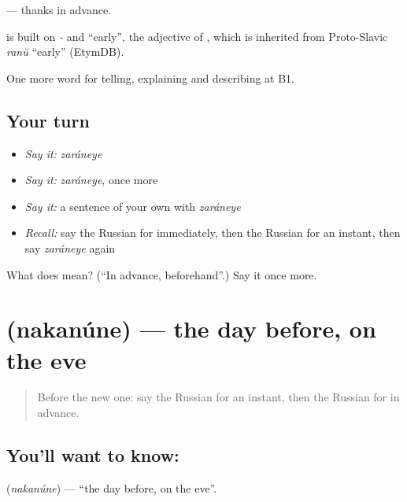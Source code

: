\emph{ } — thanks in advance.

\begin{cousinweb}
\emph{} is built on \emph{-} and \emph{} \textquotedblleft{}early\textquotedblright{}, the adjective of \emph{}, which is inherited from Proto-Slavic \emph{ranŭ} \textquotedblleft{}early\textquotedblright{} (EtymDB).
\end{cousinweb}

\begin{grammarlens}[title={What you've built}]
One more word for telling, explaining and describing at B1.
\end{grammarlens}

\subsection*{Your turn}
\begin{itemize}
\raggedright
  \item \emph{Say it:} \emph{zaráneye}
  \item \emph{Say it:} \emph{zaráneye}, once more
  \item \emph{Say it:} a sentence of your own with \emph{zaráneye}
  \item \emph{Recall:} say the Russian for immediately, then the Russian for an instant, then say \emph{zaráneye} again
\end{itemize}

\begin{tcolorbox}[breakable,colback=teal!4,colframe=teal!35!black,title={Before you move on}]
What does  mean? (\textquotedblleft{}In advance, beforehand\textquotedblright{}.) Say it once more.
\end{tcolorbox}
\section[\texorpdfstring{\ru{накануне} (nakanúne)}{накануне (nakanúne)}]{ (nakanúne) — the day before, on the eve}

\label{lesson:RU-C272-nakanune}



\begin{quote}
Before the new one: say the Russian for an instant, then the Russian for in advance.
\end{quote}

\subsection*{You'll want to know: }
\textbf{} (\emph{nakanúne}) — \textquotedblleft{}the day before, on the eve\textquotedblright{}.

